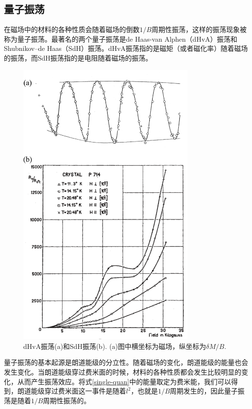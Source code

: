 \subsection{量子振荡}

在磁场中的材料的各种性质会随着磁场的倒数$1/B$周期性振荡，这样的振荡现象被称为量子振荡。最著名的两个量子振荡是de Haas-van Alphen（dHvA）振荡\cite{dHvA}和Shubnikov–de Haas（SdH）振荡\cite{SdH}。dHvA振荡指的是磁矩（或者磁化率）随着磁场的振荡，而SdH振荡指的是电阻随着磁场的振荡。

\begin{figure}
	\includegraphics[width=0.8\textwidth]{../figures/quantum-oscillation.png}
	\centering
	\caption{dHvA振荡\cite{dhillon_j._s._haas-van_1955}(a)和SdH振荡\cite{schubnikow1930neue}(b). (a)图中横坐标为磁场，纵坐标为$\delta M/B$.\label{quantum-oscillation}}
\end{figure}

量子振荡的基本起源是朗道能级的分立性。随着磁场的变化，朗道能级的能量也会发生变化。当朗道能级穿过费米面的时候，材料的各种性质都会发生比较明显的变化，从而产生振荡效应。将式\ref{single-quan}中的能量取定为费米能，我们可以得到，朗道能级穿过费米面这一事件是随着$l^2$，也就是$1/B$周期发生的，因此量子振荡是随着$1/B$周期性振荡的。


